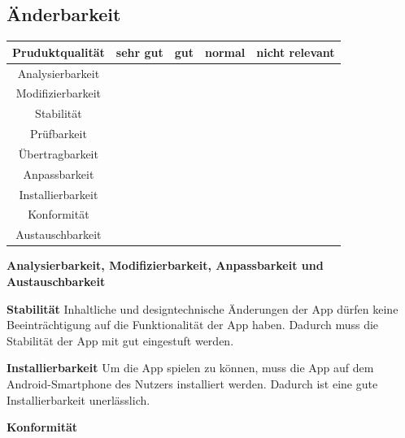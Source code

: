 \documentclass[parskip=full]{scrartcl}
\begin{document}
\subsection{Änderbarkeit}
\begin{tabular}{| c | c | c | c | c |}
    \hline
    \textbf{Pruduktqualität} & \textbf{sehr gut} & \textbf{gut} & \textbf{normal} & \textbf{nicht relevant} \\ \hline
    Analysierbarkeit         &                   &              &                 &                         \\ \hline
    Modifizierbarkeit        &                   &              &                 &                         \\ \hline
    Stabilität               &                   &              &                 &                         \\ \hline
    Prüfbarkeit              &                   &              &                 &                         \\ \hline
    Übertragbarkeit          &                   &              &                 &                         \\ \hline
    Anpassbarkeit            &                   &              &                 &                         \\ \hline
    Installierbarkeit        &                   &              &                 &                         \\ \hline
    Konformität              &                   &              &                 &                         \\ \hline
    Austauschbarkeit         &                   &              &                 &                         \\ \hline
\end{tabular}

\textbf{Analysierbarkeit, Modifizierbarkeit, Anpassbarkeit und Austauschbarkeit}

\textbf{Stabilität}
Inhaltliche und designtechnische Änderungen der App dürfen keine Beeinträchtigung auf die Funktionalität der App haben.
Dadurch muss die Stabilität der App mit gut eingestuft werden.

\textbf{Installierbarkeit}
Um die App spielen zu können, muss die App auf dem Android-Smartphone des Nutzers installiert werden.
Dadurch ist eine gute Installierbarkeit unerlässlich.

\textbf{Konformität}
\end{document}
